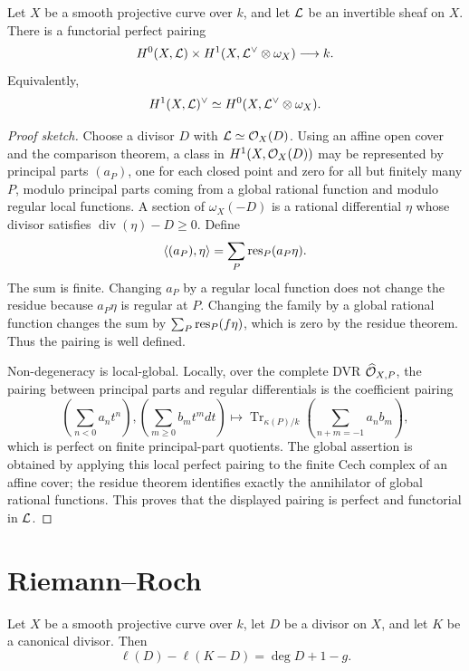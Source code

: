 \begin{theorem}
Let \(X\) be a smooth projective curve over \(k\), and let \(\mathcal{L}\) be an
invertible sheaf on \(X\).  There is a functorial perfect pairing
\[
    H^0(X,\mathcal{L})\times H^1(X,\mathcal{L}^\vee\otimes\omega_X)
    \longrightarrow k.
\]
Equivalently,
\[
    H^1(X,\mathcal{L})^\vee
    \simeq
    H^0(X,\mathcal{L}^\vee\otimes\omega_X).
\]
\end{theorem}

\begin{proof}[Proof sketch]
Choose a divisor \(D\) with \(\mathcal{L}\simeq\mathcal{O}_X(D)\).  Using an affine open cover
and the comparison theorem, a class in \(H^1(X,\mathcal{O}_X(D))\) may be represented by
principal parts \((a_P)\), one for each closed point and zero for all but
finitely many \(P\), modulo principal parts coming from a global rational
function and modulo regular local functions.  A section of
\(\omega_X(-D)\) is a rational differential \(\eta\) whose divisor satisfies
\(\operatorname{div}(\eta)-D\ge0\).  Define
\[
    \langle (a_P),\eta\rangle
    =
    \sum_P \operatorname{res}_P(a_P\eta).
\]
The sum is finite.  Changing \(a_P\) by a regular local function does not change
the residue because \(a_P\eta\) is regular at \(P\).  Changing the family by a
global rational function changes the sum by \(\sum_P\operatorname{res}_P(f\eta)\), which is
zero by the residue theorem.  Thus the pairing is well defined.

Non-degeneracy is local-global.  Locally, over the complete DVR
\(\widehat{\mathcal{O}}_{X,P}\), the pairing between principal parts and regular
differentials is the coefficient pairing
\[
    \left(\sum_{n<0} a_n t^n\right),
    \left(\sum_{m\ge0} b_m t^m dt\right)
    \longmapsto
    \operatorname{Tr}_{\kappa(P)/k}
    \left(\sum_{n+m=-1}a_nb_m\right),
\]
which is perfect on finite principal-part quotients.  The global assertion is
obtained by applying this local perfect pairing to the finite Cech complex of
an affine cover; the residue theorem identifies exactly the annihilator of
global rational functions.  This proves that the displayed pairing is perfect
and functorial in \(\mathcal{L}\).
\end{proof}

\section{Riemann--Roch}

\begin{theorem}
Let \(X\) be a smooth projective curve over \(k\), let \(D\) be a divisor on
\(X\), and let \(K\) be a canonical divisor.  Then
\[
    \ell(D)-\ell(K-D)=\deg D+1-g.
\]
\end{theorem}

